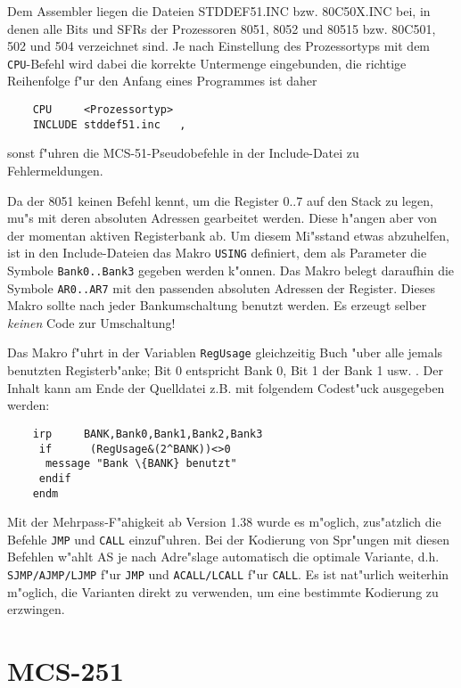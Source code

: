 \documentclass[12pt,a4paper,twoside]{report}
\newcommand{\ii}[1]{{\it #1}}
\newcommand{\tty}[1]{{\tt #1}}
\begin{document}
Dem Assembler liegen die Dateien STDDEF51.INC bzw. 80C50X.INC bei, in
denen alle Bits und SFRs der Prozessoren 8051, 8052 und 80515 bzw. 80C501,
502 und 504 verzeichnet sind.  Je nach Einstellung des Prozessortyps mit
dem \tty{CPU}-Befehl wird dabei die korrekte Untermenge eingebunden, die
richtige Reihenfolge f"ur den Anfang eines Programmes ist daher
\begin{verbatim}
	CPU     <Prozessortyp>
	INCLUDE stddef51.inc   ,
\end{verbatim}
sonst f"uhren die MCS-51-Pseudobefehle in der Include-Datei zu
Fehlermeldungen.
\par
Da der 8051 keinen Befehl kennt, um die Register 0..7 auf den Stack zu
legen, mu"s mit deren absoluten Adressen gearbeitet werden.  Diese
h"angen aber von der momentan aktiven Registerbank ab.  Um diesem Mi"sstand
etwas abzuhelfen, ist in den Include-Dateien das Makro \tty{USING} definiert,
dem als Parameter die Symbole \tty{Bank0..Bank3} gegeben werden k"onnen.
Das Makro belegt daraufhin die Symbole \tty{AR0..AR7} mit den passenden
absoluten Adressen der Register.  Dieses Makro sollte nach jeder
Bankumschaltung benutzt werden.  Es erzeugt selber \ii{keinen} Code zur
Umschaltung!
\par
Das Makro f"uhrt in der Variablen \tty{RegUsage} gleichzeitig Buch "uber
alle jemals benutzten Registerb"anke; Bit 0 entspricht Bank 0, Bit 1 der
Bank 1 usw. .  Der Inhalt kann am Ende der Quelldatei z.B. mit folgendem
Codest"uck ausgegeben werden:
\begin{verbatim}
	irp     BANK,Bank0,Bank1,Bank2,Bank3
	 if      (RegUsage&(2^BANK))<>0
	  message "Bank \{BANK} benutzt"
	 endif
	endm
\end{verbatim}
Mit der Mehrpass-F"ahigkeit ab Version 1.38 wurde es m"oglich, zus"atzlich
die Befehle \tty{JMP} und \tty{CALL} einzuf"uhren.  Bei der Kodierung
von Spr"ungen mit diesen Befehlen w"ahlt AS je nach Adre"slage automatisch
die optimale Variante, d.h. \tty{SJMP/AJMP/LJMP} f"ur \tty{JMP} und
\tty{ACALL/LCALL} f"ur \tty{CALL}.  Es ist nat"urlich weiterhin m"oglich,
die Varianten direkt zu verwenden, um eine bestimmte Kodierung zu erzwingen.


\section{MCS-251}
\end{document}
